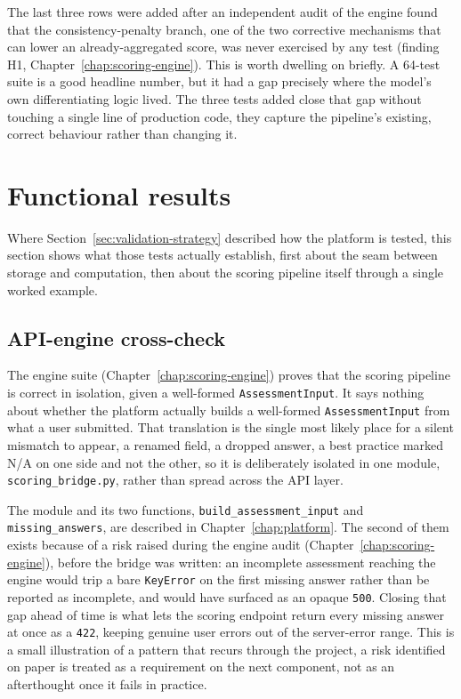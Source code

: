 The last three rows were added after an independent audit of the engine
found that the consistency-penalty branch, one of the two corrective
mechanisms that can lower an already-aggregated score, was never exercised
by any test (finding H1, Chapter~\ref{chap:scoring-engine}). This is worth dwelling on briefly. A
64-test suite is a good headline number, but it had a gap precisely where
the model's own differentiating logic lived. The three tests added close
that gap without touching a single line of production code, they capture
the pipeline's existing, correct behaviour rather than changing it.

\section{Functional results}
\label{sec:validation-functional-results}

Where Section~\ref{sec:validation-strategy} described how the platform is
tested, this section shows what those tests actually establish, first about
the seam between storage and computation, then about the scoring pipeline
itself through a single worked example.

\subsection{API-engine cross-check}
\label{sec:validation-bridge-crosscheck}

The engine suite (Chapter~\ref{chap:scoring-engine}) proves that the scoring
pipeline is correct in isolation, given a well-formed \texttt{AssessmentInput}.
It says nothing about whether the platform actually builds a well-formed
\texttt{AssessmentInput} from what a user submitted. That translation is the
single most likely place for a silent mismatch to appear, a renamed field, a
dropped answer, a best practice marked N/A on one side and not the other, so
it is deliberately isolated in one module, \texttt{scoring\_bridge.py}, rather
than spread across the API layer.

The module and its two functions, \texttt{build\_assessment\_input} and
\texttt{missing\_answers}, are described in Chapter~\ref{chap:platform}. The
second of them exists because of a risk raised during the engine audit
(Chapter~\ref{chap:scoring-engine}), before the bridge was written: an
incomplete assessment reaching the engine would trip a bare \texttt{KeyError}
on the first missing answer rather than be reported as incomplete, and would
have surfaced as an opaque \texttt{500}. Closing that gap ahead of time is what
lets the scoring endpoint return every missing answer at once as a \texttt{422},
keeping genuine user errors out of the server-error range. This is a small
illustration of a pattern that recurs through the project, a risk identified
on paper is treated as a requirement on the next component, not as an
afterthought once it fails in practice.

